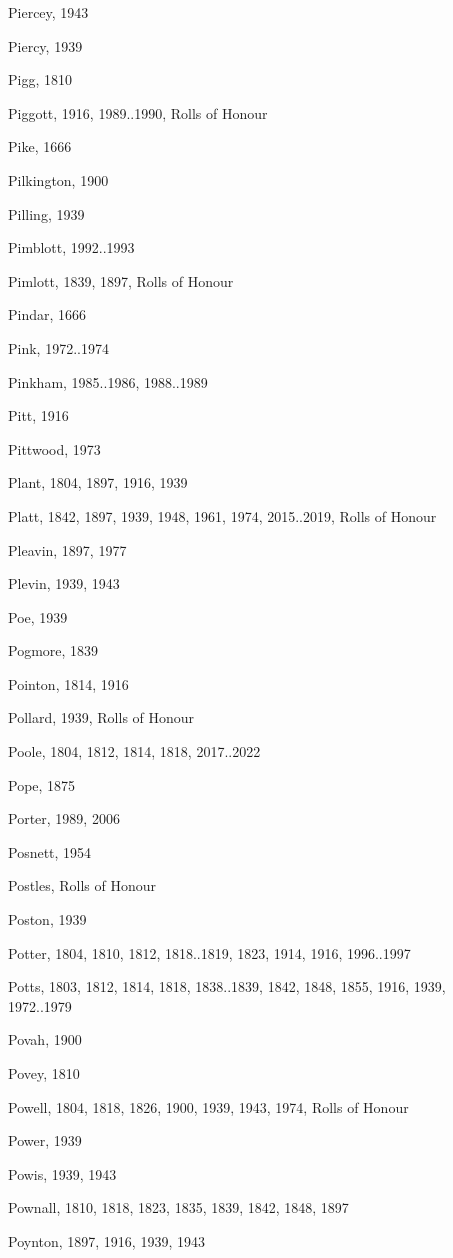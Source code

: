 \begin{theindex}
\item Piercey, 1943
\item Piercy, 1939
\item Pigg, 1810
\item Piggott, 1916, 1989..1990, Rolls of Honour
\item Pike, 1666
\item Pilkington, 1900
\item Pilling, 1939
\item Pimblott, 1992..1993
\item Pimlott, 1839, 1897, Rolls of Honour
\item Pindar, 1666
\item Pink, 1972..1974
\item Pinkham, 1985..1986, 1988..1989
\item Pitt, 1916
\item Pittwood, 1973
\item Plant, 1804, 1897, 1916, 1939
\item Platt, 1842, 1897, 1939, 1948, 1961, 1974, 2015..2019, Rolls of Honour
\item Pleavin, 1897, 1977
\item Plevin, 1939, 1943
\item Poe, 1939
\item Pogmore, 1839
\item Pointon, 1814, 1916
\item Pollard, 1939, Rolls of Honour
\item Poole, 1804, 1812, 1814, 1818, 2017..2022
\item Pope, 1875
\item Porter, 1989, 2006
\item Posnett, 1954
\item Postles, Rolls of Honour
\item Poston, 1939
\item Potter, 1804, 1810, 1812, 1818..1819, 1823, 1914, 1916, 1996..1997
\item Potts, 1803, 1812, 1814, 1818, 1838..1839, 1842, 1848, 1855, 1916, 1939, 1972..1979
\item Povah, 1900
\item Povey, 1810
\item Powell, 1804, 1818, 1826, 1900, 1939, 1943, 1974, Rolls of Honour
\item Power, 1939
\item Powis, 1939, 1943
\item Pownall, 1810, 1818, 1823, 1835, 1839, 1842, 1848, 1897
\item Poynton, 1897, 1916, 1939, 1943

\end{theindex}
